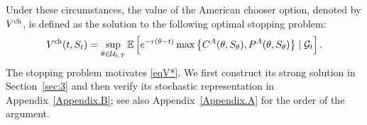 \documentclass[11pt, a4paper, leqno]{amsart}
\numberwithin{equation}{section}
\theoremstyle{plain}
\theoremstyle{definition}
\theoremstyle{remark}
\begin{document}

Under these circumstances, the value of the American chooser option, denoted by $V^{\rm ch}$, is defined as the solution to the following optimal stopping problem:
\begin{equation}\label{V_ch}
    V^{\rm ch}(t,S_t) = \sup_{\theta \in \mathcal{U}_{t,T}}\mathbb{E}\left[e^{-r(\theta-t)} \max\left\{C^A(\theta,S_{\theta}),P^A(\theta,S_{\theta})\right\}\mid \mathcal{G}_t\right].
\end{equation}
{The stopping problem motivates \eqref{eqV*}. We first
construct its strong solution in Section~\ref{sec:3} and then verify its
stochastic representation in Appendix~\ref{Appendix.B}; see also
Appendix~\ref{Appendix.A} for the order of the argument.} 
\end{document}
